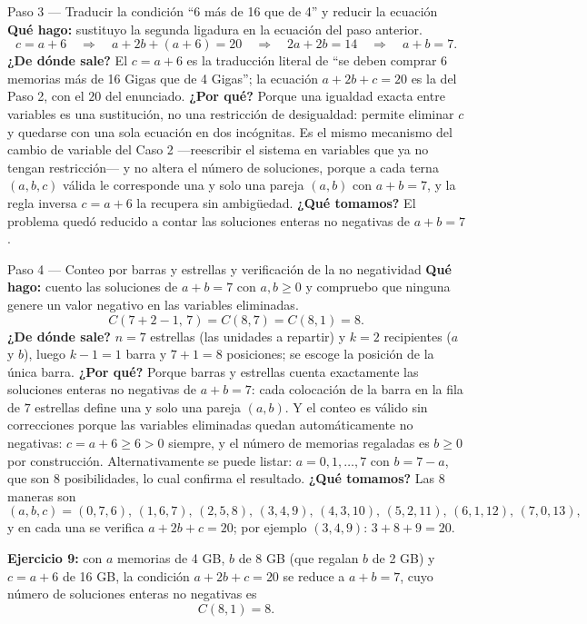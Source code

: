 \documentclass[11pt]{article}
\begin{document}
\begin{paso}{Paso 3 --- Traducir la condición ``6 más de 16 que de 4'' y reducir la ecuación}
\textbf{Qué hago:} sustituyo la segunda ligadura en la ecuación del paso anterior.
\[
c=a+6\quad\Longrightarrow\quad a+2b+(a+6)=20\quad\Longrightarrow\quad 2a+2b=14\quad\Longrightarrow\quad a+b=7 .
\]
\textbf{¿De dónde sale?} El $c=a+6$ es la traducción literal de ``se deben comprar 6 memorias más de 16 Gigas que de 4 Gigas''; la ecuación $a+2b+c=20$ es la del Paso 2, con el $20$ del enunciado.
\textbf{¿Por qué?} Porque una igualdad exacta entre variables es una sustitución, no una restricción de desigualdad: permite eliminar $c$ y quedarse con una sola ecuación en dos incógnitas. Es el mismo mecanismo del cambio de variable del Caso 2 —reescribir el sistema en variables que ya no tengan restricción— y no altera el número de soluciones, porque a cada terna $(a,b,c)$ válida le corresponde una y solo una pareja $(a,b)$ con $a+b=7$, y la regla inversa $c=a+6$ la recupera sin ambigüedad.
\textbf{¿Qué tomamos?} El problema quedó reducido a contar las soluciones enteras no negativas de $a+b=7$.
\end{paso}

\begin{paso}{Paso 4 --- Conteo por barras y estrellas y verificación de la no negatividad}
\textbf{Qué hago:} cuento las soluciones de $a+b=7$ con $a,b\ge0$ y compruebo que ninguna genere un valor negativo en las variables eliminadas.
\[
C(7+2-1,\,7)=C(8,7)=C(8,1)=8 .
\]
\textbf{¿De dónde sale?} $n=7$ estrellas (las unidades a repartir) y $k=2$ recipientes ($a$ y $b$), luego $k-1=1$ barra y $7+1=8$ posiciones; se escoge la posición de la única barra.
\textbf{¿Por qué?} Porque barras y estrellas cuenta exactamente las soluciones enteras no negativas de $a+b=7$: cada colocación de la barra en la fila de $7$ estrellas define una y solo una pareja $(a,b)$. Y el conteo es válido sin correcciones porque las variables eliminadas quedan automáticamente no negativas: $c=a+6\ge6>0$ siempre, y el número de memorias regaladas es $b\ge0$ por construcción. Alternativamente se puede listar: $a=0,1,\ldots,7$ con $b=7-a$, que son $8$ posibilidades, lo cual confirma el resultado.
\textbf{¿Qué tomamos?} Las $8$ maneras son
\[
(a,b,c)=(0,7,6),\,(1,6,7),\,(2,5,8),\,(3,4,9),\,(4,3,10),\,(5,2,11),\,(6,1,12),\,(7,0,13),
\]
y en cada una se verifica $a+2b+c=20$; por ejemplo $(3,4,9)$: $3+8+9=20$.
\end{paso}

\begin{resp}
\textbf{Ejercicio 9:} con $a$ memorias de 4 GB, $b$ de 8 GB (que regalan $b$ de 2 GB) y $c=a+6$ de 16 GB, la condición $a+2b+c=20$ se reduce a $a+b=7$, cuyo número de soluciones enteras no negativas es
\[
C(8,1)=8 .
\]
\end{resp}
\end{document}
